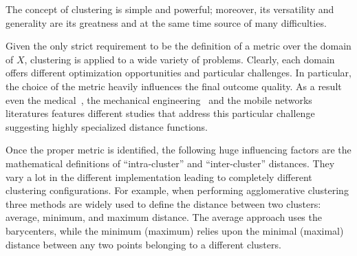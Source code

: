 The concept of clustering is simple and powerful; moreover, its versatility
and generality are its greatness and at the same time source of many difficulties.


Given the only strict requirement to be the definition of a metric over the
domain of $X$, clustering is applied to a wide variety of problems.
Clearly, each domain offers different optimization opportunities and
particular challenges.
In particular, the choice of the metric heavily influences the final outcome quality.
As a result even the medical~\cite{siless2013comparison}, the mechanical
engineering~\cite{wilding2011clustering} and the mobile networks~\cite{cheng2009stability}
literatures features different studies that address this particular challenge
suggesting highly specialized distance functions.


Once the proper metric is identified, the following huge influencing factors
are the mathematical definitions of ``intra-cluster'' and ``inter-cluster''
distances. They vary a lot in the different implementation leading to
completely different clustering configurations.
For example, when performing agglomerative clustering three methods
are widely used to define the distance between two clusters:
average, minimum, and maximum distance.
The average approach uses the barycenters, while the minimum (maximum)
relies upon the minimal (maximal) distance between any two points
belonging to a different clusters.



